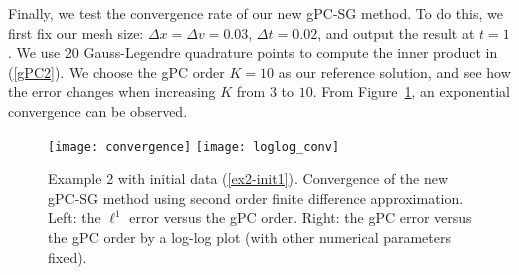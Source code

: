 \documentclass[12pt]{article}
\theoremstyle{plain}
\theoremstyle{remark}
\theoremstyle{remark}
\theoremstyle{remark}
\numberwithin{equation}{section}
\begin{document}
Finally, we test the convergence rate of our new gPC-SG method. To do this, we first fix our mesh size: $\Delta x = \Delta v = 0.03$, $\Delta t = 0.02$, and output the result at $t=1$. We  use $20$ Gauss-Legendre quadrature points to compute the inner product in (\ref{gPC2}). We choose the gPC order $K=10$ as our reference solution, and see how the error changes when increasing $K$ from $3$ to $10$. From Figure~\ref{14}, an exponential convergence can be observed.
\begin{figure}
  \texttt{[image: convergence]}
  \texttt{[image: loglog\_conv]}
  \caption{Example 2 with initial data (\ref{ex2-init1}). Convergence of the new gPC-SG method using second order finite difference approximation. Left: the $\ell^1$ error versus the gPC order. Right: the gPC error versus the gPC order by a log-log plot (with other numerical parameters fixed).}
  \label{14}
\end{figure}
\end{document}

